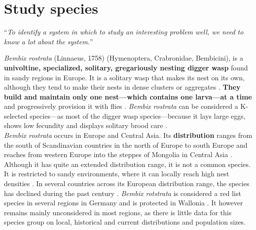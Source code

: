\documentclass[10pt, twoside]{book} %
\begin{document}
	\section{Study species}
	\vspace*{1cm}
	``\textit{To identify a system in which to study an interesting problem well, we need to know a lot about the system.}'' \hspace*{\fill}\citet{travis2020}\\
	
	\vspace*{1cm}
	
	\textit{Bembix rostrata} (Linnaeus, 1758) (Hymenoptera, Crabronidae, Bembicini), is a \textbf{univoltine, specialized, solitary, gregariously nesting digger wasp} found in sandy regions in Europe. It is a solitary wasp that makes its nest on its own, although they tend to make their nests in dense clusters or aggregates \citep{larsson1986}. \textbf{They build and maintain only one nest---which contains one larva---at a time} and progressively provision it with flies \citep{nielsen1945, larsson1989, tengo1996}. \textit{Bembix rostrata} can be considered a K-selected species---as most of the digger wasp species---because it lays large eggs, shows low fecundity and displays solitary brood care \citep{larsson1989, evans2007}.\\
	
	\textit{Bembix rostrata} occurs in Europe and Central Asia. Its \textbf{distribution} ranges from the south of Scandinavian countries in the north of Europe to south Europe and reaches from western Europe into the steppes of Mongolia in Central Asia \citep{bitsch1997}. Although it has quite an extended distribution range, it is not a common species. It is restricted to sandy environments, where it can locally reach high nest densities \citep{barbier2007}. In several countries across its European distribution range, the species has declined during the past century \citep{pinkhof1924, thijsse1924, blosch2000, klein2004, barbier2007, bogusch2021}. \textit{Bembix rotstrata} is considered a red list species in several regions in Germany \citep{jacobs2000, barbier2007} and is protected in Wallonia \citep[Belgium;][]{barbier2007}. It however remains mainly unconsidered in most regions, as there is little data for this species group on local, historical and current distributions and population sizes.\\
	
\end{document}
